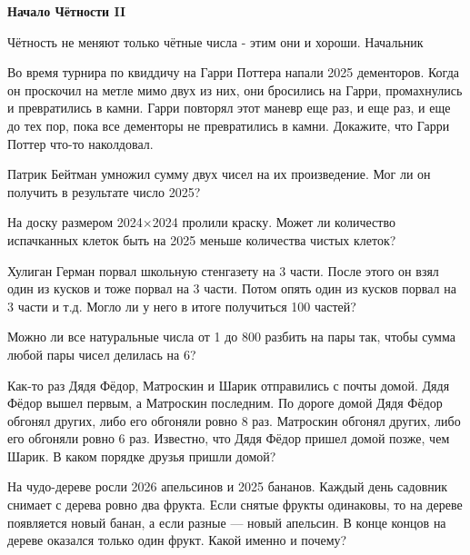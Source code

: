 \centerline{\bf \Huge Начало Чётности II}

\begin{flushright}
        \scriptsize{Чётность не меняют только чётные числа - этим они и хороши. Начальник}
\end{flushright}

 Во время турнира по квиддичу на Гарри Поттера напали 2025 дементоров. Когда он проскочил на метле мимо двух из них, они бросились на Гарри, промахнулись и превратились в камни. Гарри повторял этот маневр еще раз, и еще раз, и еще до тех пор, пока все дементоры не превратились в камни. Докажите, что Гарри Поттер что-то наколдовал.

 Патрик Бейтман умножил сумму двух чисел на их произведение. Мог ли он получить в результате число 2025?

 На доску размером 2024$\times$2024 пролили краску. Может ли количество испачканных клеток быть на 2025 меньше количества чистых клеток? 

 Хулиган Герман порвал школьную стенгазету на 3 части. После этого он взял один из кусков и тоже порвал на 3 части. Потом опять один из кусков порвал на 3 части и т.д. Могло ли у него в итоге получиться 100 частей?

 Можно ли все натуральные числа от 1 до 800 разбить на пары так,
чтобы сумма любой пары чисел делилась на 6? 

 Как-то раз Дядя Фёдор, Матроскин и Шарик отправились
с почты домой. Дядя Фёдор вышел первым, а Матроскин последним. По дороге домой Дядя
Фёдор обгонял других, либо его обгоняли ровно 8 раз. Матроскин обгонял других, либо его
обгоняли ровно 6 раз. Известно, что Дядя Фёдор пришел домой позже, чем Шарик. В каком
порядке друзья пришли домой?

 На чудо-дереве росли 2026 апельсинов и 2025 бананов. Каждый день садовник снимает с дерева ровно два фрукта. Если снятые фрукты одинаковы, то на дереве появляется новый
банан, а если разные — новый апельсин. В конце концов на дереве оказался только один фрукт.
Какой именно и почему?

